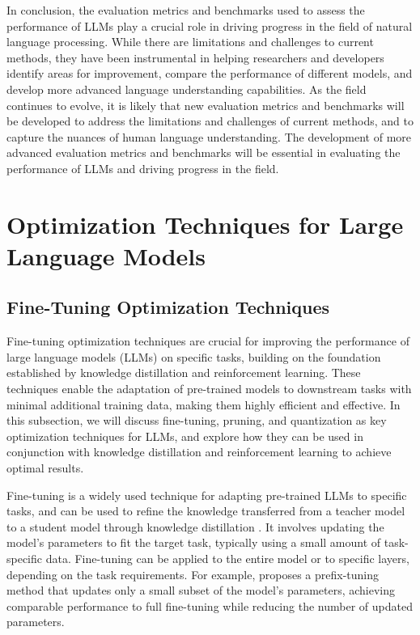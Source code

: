 \documentclass[11pt]{article}
\begin{document}
In conclusion, the evaluation metrics and benchmarks used to assess the performance of LLMs play a crucial role in driving progress in the field of natural language processing. While there are limitations and challenges to current methods, they have been instrumental in helping researchers and developers identify areas for improvement, compare the performance of different models, and develop more advanced language understanding capabilities. As the field continues to evolve, it is likely that new evaluation metrics and benchmarks will be developed to address the limitations and challenges of current methods, and to capture the nuances of human language understanding. The development of more advanced evaluation metrics and benchmarks will be essential in evaluating the performance of LLMs and driving progress in the field.

\section{Optimization Techniques for Large Language Models}

\subsection{Fine-Tuning Optimization Techniques}

Fine-tuning optimization techniques are crucial for improving the performance of large language models (LLMs) on specific tasks, building on the foundation established by knowledge distillation and reinforcement learning. These techniques enable the adaptation of pre-trained models to downstream tasks with minimal additional training data, making them highly efficient and effective. In this subsection, we will discuss fine-tuning, pruning, and quantization as key optimization techniques for LLMs, and explore how they can be used in conjunction with knowledge distillation and reinforcement learning to achieve optimal results.

Fine-tuning is a widely used technique for adapting pre-trained LLMs to specific tasks, and can be used to refine the knowledge transferred from a teacher model to a student model through knowledge distillation \cite{ref80}. It involves updating the model's parameters to fit the target task, typically using a small amount of task-specific data. Fine-tuning can be applied to the entire model or to specific layers, depending on the task requirements. For example, \cite{ref98} proposes a prefix-tuning method that updates only a small subset of the model's parameters, achieving comparable performance to full fine-tuning while reducing the number of updated parameters.
\end{document}
